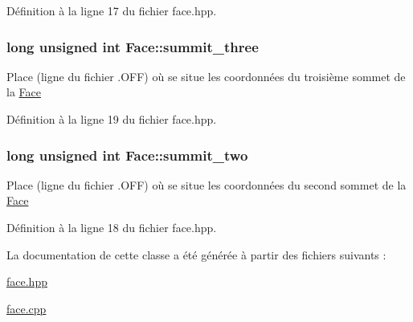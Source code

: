 Définition à la ligne 17 du fichier face.\-hpp.

\hypertarget{class_face_ad10219db49c55f03d38533424bfa1c0c}{
\subsubsection[{summit\-\_\-three}]{\setlength{\rightskip}{0pt plus 5cm}long unsigned int Face\-::summit\-\_\-three\hspace{0.3cm}{\ttfamily [private]}}}\label{class_face_ad10219db49c55f03d38533424bfa1c0c}
Place (ligne du fichier .O\-F\-F) où se situe les coordonnées du troisième sommet de la \hyperlink{class_face}{Face} 

Définition à la ligne 19 du fichier face.\-hpp.

\hypertarget{class_face_aa46034f67b74525862dda3452dab6f89}{
\subsubsection[{summit\-\_\-two}]{\setlength{\rightskip}{0pt plus 5cm}long unsigned int Face\-::summit\-\_\-two\hspace{0.3cm}{\ttfamily [private]}}}\label{class_face_aa46034f67b74525862dda3452dab6f89}
Place (ligne du fichier .O\-F\-F) où se situe les coordonnées du second sommet de la \hyperlink{class_face}{Face} 

Définition à la ligne 18 du fichier face.\-hpp.



La documentation de cette classe a été générée à partir des fichiers suivants \-:\begin{DoxyCompactItemize}
\item 
\hyperlink{face_8hpp}{face.\-hpp}\item 
\hyperlink{face_8cpp}{face.\-cpp}\end{DoxyCompactItemize}
